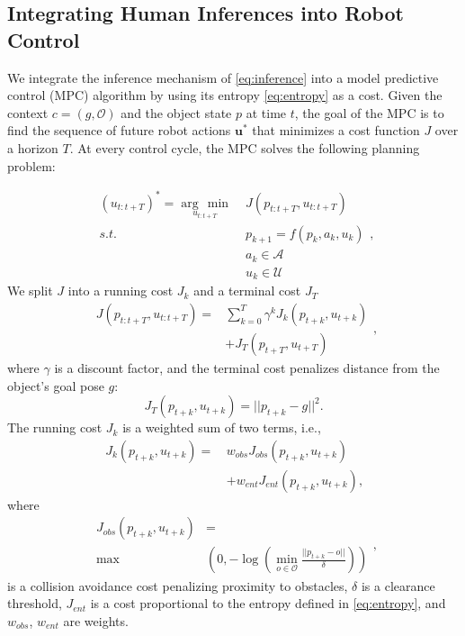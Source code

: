 \subsection{Integrating Human Inferences into Robot Control}\label{sec:control}

We integrate the inference mechanism of \eqref{eq:inference} into a model predictive control (MPC) algorithm by using its entropy \eqref{eq:entropy} as a cost. Given the context $c = (g, \mathcal{O})$ and the object state $p$ at time $t$, the goal of the MPC is to find the sequence of future robot actions $\boldsymbol{u}^*$ that minimizes a cost function $J$ over a horizon $T$. At every control cycle, the MPC solves the following planning problem:

\begin{equation}
\begin{split}
\left(u_{t:t+T}\right)^{*} = \underset{u_{t:t+T}} {\arg\,\min}\; & J(p_{t:t+T}, u_{t:t+T})\\
    s.t.\: & p_{k+1} = f(p_k, a_k, u_k) \\
           & a_k \in \mathcal{A} \\
           & u_k\in\mathcal{U}
   \label{eq:mpc}
\end{split}\mbox{,}
\end{equation}
We split $J$ into a running cost $J_k$ and a terminal cost $J_T$
\begin{equation}
\begin{split}
     J(p_{t:t+T}, u_{t:t+T}) = & \sum_{k=0}^{T} \gamma^k J_k(p_{t+k}, u_{t+k})\\
        &+ J_T(p_{t+T}, u_{t+T})
\end{split}
        \mbox{,}
\end{equation}
where $\gamma$ is a discount factor, and the terminal cost penalizes distance from the object's goal pose $g$:
\begin{equation}
    J_T(p_{t+k}, u_{t+k}) = || p_{t+k} - g ||^2
    \mbox{.}
\end{equation}
The running cost $J_k$ is a weighted sum of two terms, i.e.,
\begin{equation}
    \begin{split}
        J_k(p_{t+k}, u_{t+k}) =\,& w_{obs} J_{obs}(p_{t+k}, u_{t+k})\\ &+ w_{ent} J_{ent}(p_{t+k}, u_{t+k})\mbox{,}
    \end{split}\label{eq:mpc-running-cost}
\end{equation}
where
\begin{equation}
    \begin{split}
    J_{obs}(p_{t+k}, u_{t+k}) &=\\ \max & \left(0, -\log\left(\underset{o \in \mathcal{O}}{\min} \frac{||p_{t+k} - o||}{\delta}\right)\right)
    \end{split}
    \mbox{,}
\end{equation}
is a collision avoidance cost penalizing proximity to obstacles, $\delta$ is a clearance threshold, $J_{ent}$ is a cost proportional to the entropy defined in \eqref{eq:entropy}, and $w_{obs}$, $w_{ent}$ are weights.


